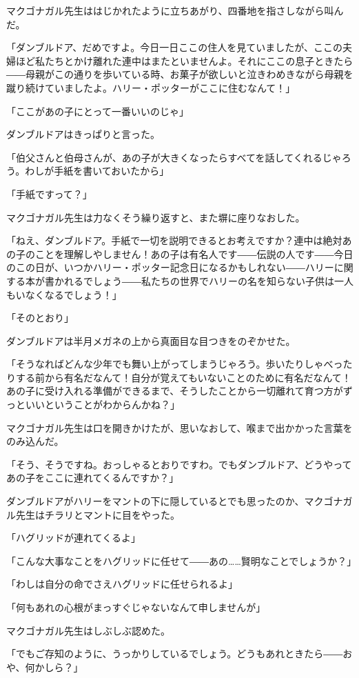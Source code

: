 \documentclass[10pt,a4paper]{article}
\begin{document}
\begin{CJK}{UTF8}{min}
マクゴナガル先生ははじかれたように立ちあがり、四番地を指さしながら叫んだ。

「ダンブルドア、だめですよ。今日一日ここの住人を見ていましたが、ここの夫婦ほど私たちとかけ離れた連中はまたといませんよ。それにここの息子ときたら――母親がこの通りを歩いている時、お菓子が欲しいと泣きわめきながら母親を蹴り続けていましたよ。ハリー・ポッターがここに住むなんて！」

「ここがあの子にとって一番いいのじゃ」

ダンブルドアはきっぱりと言った。

「伯父さんと伯母さんが、あの子が大きくなったらすべてを話してくれるじゃろう。わしが手紙を書いておいたから」

「手紙ですって？」

マクゴナガル先生は力なくそう繰り返すと、また塀に座りなおした。

「ねえ、ダンブルドア。手紙で一切を説明できるとお考えですか？連中は絶対あの子のことを理解しやしません！あの子は有名人です――伝説の人です――今日のこの日が、いつかハリー・ポッター記念日になるかもしれない――ハリーに関する本が書かれるでしょう――私たちの世界でハリーの名を知らない子供は一人もいなくなるでしょう！」

「そのとおり」

ダンブルドアは半月メガネの上から真面目な目つきをのぞかせた。

「そうなればどんな少年でも舞い上がってしまうじゃろう。歩いたりしゃべったりする前から有名だなんて！自分が覚えてもいないことのために有名だなんて！あの子に受け入れる準備ができるまで、そうしたことから一切離れて育つ方がずっといいということがわからんかね？」

マクゴナガル先生は口を開きかけたが、思いなおして、喉まで出かかった言葉をのみ込んだ。

「そう、そうですね。おっしゃるとおりですわ。でもダンブルドア、どうやってあの子をここに連れてくるんですか？」

ダンブルドアがハリーをマントの下に隠しているとでも思ったのか、マクゴナガル先生はチラリとマントに目をやった。

「ハグリッドが連れてくるよ」

「こんな大事なことをハグリッドに任せて――あの……賢明なことでしょうか？」

「わしは自分の命でさえハグリッドに任せられるよ」

「何もあれの心根がまっすぐじゃないなんて申しませんが」

マクゴナガル先生はしぶしぶ認めた。

「でもご存知のように、うっかりしているでしょう。どうもあれときたら――おや、何かしら？」


\end{CJK}
\end{document}

